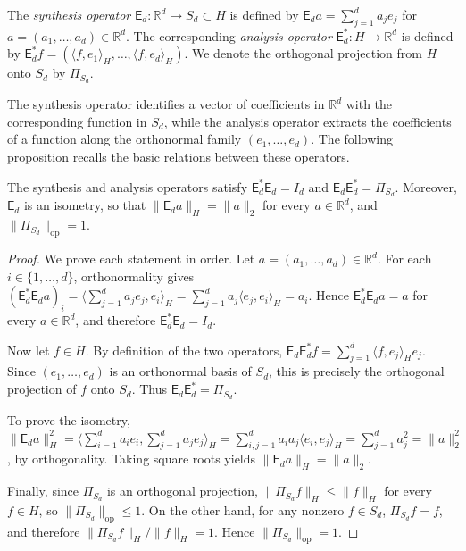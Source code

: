 \begin{definition}\label{def:Synthesis and analysis operators}
The \emph{synthesis operator} \(\mathsf E_d:\mathbb R^d\to S_d\subset H\) is defined by \(\mathsf E_d a=\sum_{j=1}^d a_j e_j\) for \(a=(a_1,\ldots,a_d)\in\mathbb R^d\). The corresponding \emph{analysis operator} \(\mathsf E_d^*:H\to\mathbb R^d\) is defined by \(\mathsf E_d^*f=(\langle f,e_1\rangle_H,\ldots,\langle f,e_d\rangle_H)\). We denote the orthogonal projection from \(H\) onto \(S_d\) by \(\Pi_{S_d}\).
\end{definition}

The synthesis operator identifies a vector of coefficients in \(\mathbb R^d\) with the corresponding function in \(S_d\), while the analysis operator extracts the coefficients of a function along the orthonormal family \((e_1,\ldots,e_d)\). The following proposition recalls the basic relations between these operators.

\begin{proposition}\label{prop:Basic identities for the approximation space}
The synthesis and analysis operators satisfy \(\mathsf E_d^*\mathsf E_d=I_d\) and \(\mathsf E_d\mathsf E_d^*=\Pi_{S_d}\). Moreover, \(\mathsf E_d\) is an isometry, so that \(\|\mathsf E_d a\|_H=\|a\|_2\) for every \(a\in\mathbb R^d\), and \(\|\Pi_{S_d}\|_{\mathrm{op}}=1\).
\end{proposition}

\begin{proof}
We prove each statement in order. Let \(a=(a_1,\ldots,a_d)\in\mathbb R^d\). For each \(i\in\{1,\ldots,d\}\), orthonormality gives \((\mathsf E_d^*\mathsf E_d a)_i=\langle\sum_{j=1}^d a_j e_j,e_i\rangle_H=\sum_{j=1}^d a_j\langle e_j,e_i\rangle_H=a_i\). Hence \(\mathsf E_d^*\mathsf E_d a=a\) for every \(a\in\mathbb R^d\), and therefore \(\mathsf E_d^*\mathsf E_d=I_d\).

Now let \(f\in H\). By definition of the two operators, \(\mathsf E_d\mathsf E_d^*f=\sum_{j=1}^d\langle f,e_j\rangle_H e_j\). Since \((e_1,\ldots,e_d)\) is an orthonormal basis of \(S_d\), this is precisely the orthogonal projection of \(f\) onto \(S_d\). Thus \(\mathsf E_d\mathsf E_d^*=\Pi_{S_d}\).

To prove the isometry, \(\|\mathsf E_d a\|_H^2=\langle\sum_{i=1}^d a_i e_i,\sum_{j=1}^d a_j e_j\rangle_H=\sum_{i,j=1}^d a_i a_j\langle e_i,e_j\rangle_H=\sum_{j=1}^d a_j^2=\|a\|_2^2\), by orthogonality. Taking square roots yields \(\|\mathsf E_d a\|_H=\|a\|_2\).

Finally, since \(\Pi_{S_d}\) is an orthogonal projection, \(\|\Pi_{S_d}f\|_H\leqslant\|f\|_H\) for every \(f\in H\), so \(\|\Pi_{S_d}\|_{\mathrm{op}}\leqslant1\). On the other hand, for any nonzero \(f\in S_d\), \(\Pi_{S_d}f=f\), and therefore \(\|\Pi_{S_d}f\|_H/\|f\|_H=1\). Hence \(\|\Pi_{S_d}\|_{\mathrm{op}}=1\).
\end{proof}


